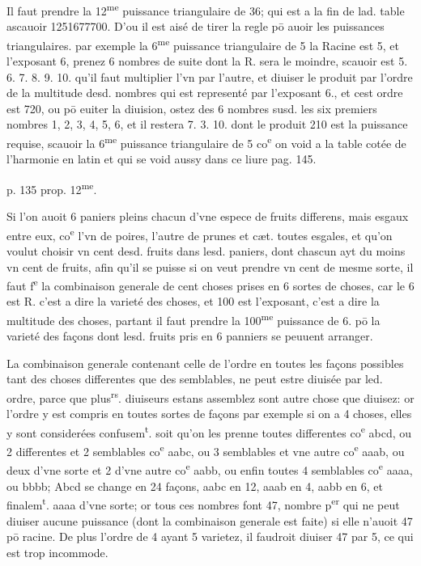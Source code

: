 \documentclass[11pt,a4paper]{article}
\begin{document}

Il faut prendre la 12\textsuperscript{me} puissance triangulaire de 36; qui est a la fin de lad. table ascauoir 1251677700. D'ou il est aisé de tirer la regle pō auoir les puissances triangulaires. par exemple la 6\textsuperscript{me} puissance triangulaire de 5 la Racine est 5, et l'exposant 6, prenez 6 nombres de suite dont la R. sera le moindre, scauoir est 5. 6. 7. 8. 9. 10. qu'il faut multiplier l'vn par l'autre, et diuiser le produit par l'ordre de la multitude desd. nombres qui est representé par l'exposant 6., et cest ordre est 720, ou pō euiter la diuision, ostez des 6 nombres susd. les six premiers nombres 1, 2, 3, 4, 5, 6, et il restera 7. 3. 10. dont le produit 210 est la puissance requise, scauoir la 6\textsuperscript{me} puissance triangulaire de 5 co\textsuperscript{e} on void a la table cotée de l'harmonie en latin et qui se void aussy dans ce liure pag. 145.

p. 135 prop. 12\textsuperscript{me}.

Si l'on auoit 6 paniers pleins chacun d'vne espece de \struck{\ill{}} fruits differens, mais esgaux entre eux, co\textsuperscript{e} l'vn de poires, l'autre de prunes et cæt. toutes esgales, et qu'on voulut choisir vn cent desd. fruits dans lesd. paniers, dont chascun ayt du moins vn cent de fruits, afin qu'il se puisse si on veut prendre vn cent de mesme sorte, il faut f\textsuperscript{e} la combinaison generale de cent choses prises en 6 sortes de choses, car le 6 est R. c'est a dire la varieté des choses, et 100 est l'exposant, c'est a dire la multitude des choses, partant il faut prendre la 100\textsuperscript{me} puissance de 6. pō la varieté des  façons dont lesd. fruits pris en 6 panniers se peuuent arranger.

La combinaison generale contenant celle de l'ordre en toutes les façons possibles tant des choses differentes que des semblables, ne peut estre diuisée par led. ordre, parce que plus\textsuperscript{rs}. diuiseurs estans assemblez sont autre chose que diuisez: or l'ordre y est compris en toutes sortes de façons par exemple si on a 4 choses, elles y sont considerées confusem\textsuperscript{t}. soit qu'on les prenne toutes differentes co\textsuperscript{e} abcd, ou 2 differentes et 2 semblables co\textsuperscript{e} aabc, ou 3 semblables et vne autre co\textsuperscript{e} aaab, ou deux d'vne sorte et 2 d'vne autre co\textsuperscript{e} aabb, ou enfin toutes 4 semblables co\textsuperscript{e} aaaa, ou bbbb; Abcd se change en 24 façons, aabc en 12, aaab en 4, aabb en 6, et finalem\textsuperscript{t}. aaaa d'vne sorte; or tous ces nombres font 47, nombre p\textsuperscript{er} qui ne peut diuiser aucune puissance (dont la combinaison generale est faite) si elle n'auoit 47 pō racine. De plus l'ordre de 4 ayant 5 varietez, il faudroit diuiser 47 par 5, ce qui est trop incommode.
\end{document}
